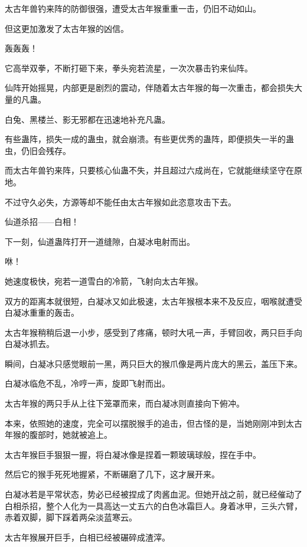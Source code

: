 
\begin{this_body}



太古年兽钓来阵的防御很强，遭受太古年猴重重一击，仍旧不动如山。

但这更加激发了太古年猴的凶信。

轰轰轰！

它高举双拳，不断打砸下来，拳头宛若流星，一次次暴击钓来仙阵。

仙阵开始摇晃，内部更是剧烈的震动，伴随着太古年猴的每一次重击，都会损失大量的凡蛊。

白兔、黑楼兰、影无邪都在迅速地补充凡蛊。

有些蛊阵，损失一成的蛊虫，就会崩溃。有些更优秀的蛊阵，即便损失一半的蛊虫，仍旧会残存。

而太古年兽钓来阵，只要核心仙蛊不失，并且超过六成尚在，它就能继续坚守在原地。

不过守久必失，方源等却不能任由太古年猴如此恣意攻击下去。

仙道杀招——白相！

下一刻，仙道蛊阵打开一道缝隙，白凝冰电射而出。

咻！

她速度极快，宛若一道雪白的冷箭，飞射向太古年猴。

双方的距离本就很短，白凝冰又如此极速，太古年猴根本来不及反应，咽喉就遭受白凝冰重重的轰击。

太古年猴稍稍后退一小步，感受到了疼痛，顿时大吼一声，手臂回收，两只巨手向白凝冰抓去。

瞬间，白凝冰只感觉眼前一黑，两只巨大的猴爪像是两片庞大的黑云，盖压下来。

白凝冰临危不乱，冷哼一声，旋即飞射而出。

太古年猴的两只手从上往下笼罩而来，而白凝冰则直接向下俯冲。

本来，依照她的速度，完全可以摆脱猴手的追击，但古怪的是，当她刚刚冲到太古年猴的腹部时，她就被追上。

太古年猴巨手狠狠一握，将白凝冰像是捏着一颗玻璃球般，捏在手中。

然后它的猴手死死地握紧，不断碾磨了几下，这才展开来。

白凝冰若是平常状态，势必已经被捏成了肉酱血泥。但她开战之前，就已经催动了白相杀招，整个人化为一具高达一丈五六的白色冰霜巨人。身着冰甲，三头六臂，赤着双脚，脚下踩着两朵淡蓝寒云。

太古年猴展开巨手，白相已经被碾碎成渣滓。


\end{this_body}
